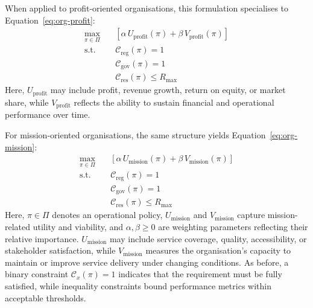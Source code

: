 \documentclass[oneside,10pt]{swissi}
\begin{document}
When applied to profit-oriented organisations, this formulation specialises to Equation~\eqref{eq:org-profit}:
\begin{align}
\max_{\pi \in \Pi} \quad & \left[ \alpha \, U_{\text{profit}}(\pi) + \beta \, V_{\text{profit}}(\pi) \right] \label{eq:org-profit} \\
\text{s.t.} \quad
& \mathcal{C}_{\text{reg}}(\pi) = 1 \nonumber \\
& \mathcal{C}_{\text{gov}}(\pi) = 1 \nonumber \\
& \mathcal{C}_{\text{res}}(\pi) \leq R_{\max} \nonumber
\end{align}
Here, $U_{\text{profit}}$ may include profit, revenue growth, return on equity, or market share, while $V_{\text{profit}}$ reflects the ability to sustain financial and operational performance over time.

For mission-oriented organisations, the same structure yields Equation~\eqref{eq:org-mission}:
\begin{align}
\max_{\pi \in \Pi} \quad & \left[ \alpha \, U_{\text{mission}}(\pi) + \beta \, V_{\text{mission}}(\pi) \right] \label{eq:org-mission} \\
\text{s.t.} \quad
& \mathcal{C}_{\text{reg}}(\pi) = 1 \nonumber \\
& \mathcal{C}_{\text{gov}}(\pi) = 1 \nonumber \\
& \mathcal{C}_{\text{res}}(\pi) \leq R_{\max} \nonumber
\end{align}
Here, $\pi \in \Pi$ denotes an operational policy, $U_{\text{mission}}$ and $V_{\text{mission}}$ capture mission-related utility and viability, and $\alpha, \beta \geq 0$ are weighting parameters reflecting their relative importance. $U_{\text{mission}}$ may include service coverage, quality, accessibility, or stakeholder satisfaction, while $V_{\text{mission}}$ measures the organisation’s capacity to maintain or improve service delivery under changing conditions. As before, a binary constraint $\mathcal{C}_x(\pi) = 1$ indicates that the requirement must be fully satisfied, while inequality constraints bound performance metrics within acceptable thresholds.
\end{document}
